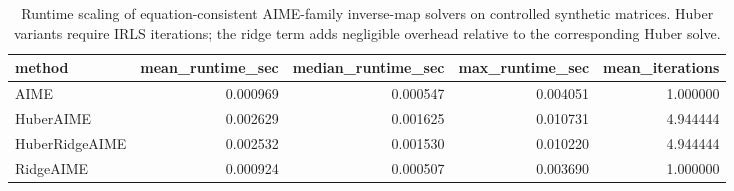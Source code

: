 \begin{table}[t]
\caption{Runtime scaling of equation-consistent AIME-family inverse-map solvers on controlled synthetic matrices. Huber variants require IRLS iterations; the ridge term adds negligible overhead relative to the corresponding Huber solve.}
\label{tab:main_corrected_runtime}
\begin{tabular}{lrrrr}
\toprule
method & mean_runtime_sec & median_runtime_sec & max_runtime_sec & mean_iterations \\
\midrule
AIME & 0.000969 & 0.000547 & 0.004051 & 1.000000 \\
HuberAIME & 0.002629 & 0.001625 & 0.010731 & 4.944444 \\
HuberRidgeAIME & 0.002532 & 0.001530 & 0.010220 & 4.944444 \\
RidgeAIME & 0.000924 & 0.000507 & 0.003690 & 1.000000 \\
\bottomrule
\end{tabular}
\end{table}
